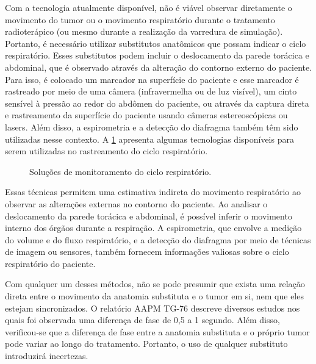 \documentclass[11pt,a4paper]{article}
\begin{document}
	
	Com a tecnologia atualmente disponível, não é viável observar diretamente o movimento do tumor ou o movimento respiratório durante o tratamento radioterápico (ou mesmo durante a realização da varredura de simulação). Portanto, é necessário utilizar substitutos anatômicos que possam indicar o ciclo respiratório. Esses substitutos podem incluir o deslocamento da parede torácica e abdominal, que é observado através da alteração do contorno externo do paciente. Para isso, é colocado um marcador na superfície do paciente e esse marcador é rastreado por meio de uma câmera (infravermelha ou de luz visível), um cinto sensível à pressão ao redor do abdômen do paciente, ou através da captura direta e rastreamento da superfície do paciente usando câmeras estereoscópicas ou lasers. Além disso, a espirometria e a detecção do diafragma também têm sido utilizadas nesse contexto. A \ref{fig:gmrTracking} apresenta algumas tecnologias disponíveis para serem utilizadas no rastreamento do ciclo respiratório.

	\begin{figure}[h]
		\centering
		\caption{Soluções de monitoramento do ciclo respiratório.}
		\label{fig:gmrTracking}
	\end{figure}

	Essas técnicas permitem uma estimativa indireta do movimento respiratório ao observar as alterações externas no contorno do paciente. Ao analisar o deslocamento da parede torácica e abdominal, é possível inferir o movimento interno dos órgãos durante a respiração. A espirometria, que envolve a medição do volume e do fluxo respiratório, e a detecção do diafragma por meio de técnicas de imagem ou sensores, também fornecem informações valiosas sobre o ciclo respiratório do paciente.

	Com qualquer um desses métodos, não se pode presumir que exista uma relação direta entre o movimento da anatomia substituta e o tumor em si, nem que eles estejam sincronizados. O relatório AAPM TG-76 descreve diversos estudos nos quais foi observada uma diferença de fase de 0,5 a 1 segundo. Além disso, verificou-se que a diferença de fase entre a anatomia substituta e o próprio tumor pode variar ao longo do tratamento. Portanto, o uso de qualquer substituto introduzirá incertezas.
\end{document}

